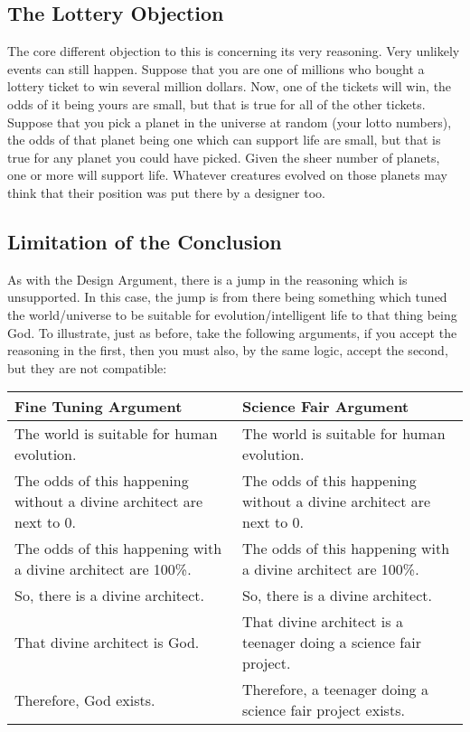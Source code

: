 \subsection{The Lottery Objection}

The core different objection to this is concerning its very reasoning. Very unlikely events can still happen. Suppose that you are one of millions who bought a lottery ticket to win several million dollars. Now, one of the tickets will win, the odds of it being yours are small, but that is true for all of the other tickets. Suppose that you pick a planet in the universe at random (your lotto numbers), the odds of that planet being one which can support life are small, but that is true for any planet you could have picked. Given the sheer number of planets, one or more will support life. Whatever creatures evolved on those planets may think that their position was put there by a designer too.
\subsection{Limitation of the Conclusion}

As with the Design Argument, there is a jump in the reasoning which is unsupported. In this case, the jump is from there being something which tuned the world/universe to be suitable for evolution/intelligent life to that thing being God. To illustrate, just as before, take the following arguments, if you accept the reasoning in the first, then you must also, by the same logic, accept the second, but they are not compatible:
\noindent
\begin{tabular}{p{2.75in}|p{2.75in}}
Fine Tuning Argument&Science Fair Argument\\\hline
    The world is suitable for human evolution.&The world is suitable for human evolution.\\
    The odds of this happening without a divine architect are next to 0.& The odds of this happening without a divine architect are next to 0.\\
    The odds of this happening with a divine architect are 100\%.&The odds of this happening with a divine architect are 100\%.\\
    So, there is a divine architect.&So, there is a divine architect.\\
    That divine architect is God.&That divine architect is a teenager doing a science fair project.\\
    Therefore, God exists.&Therefore, a teenager doing a science fair project exists.\\
\end{tabular} 
